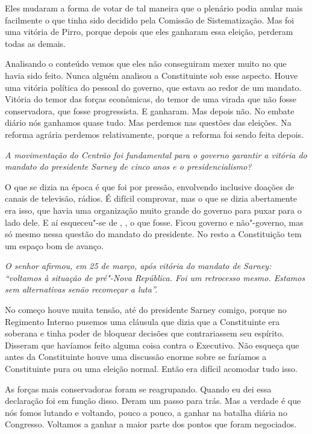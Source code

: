 Eles mudaram a forma de votar de tal maneira que o plenário podia anular
mais facilmente o que tinha sido decidido pela Comissão de
Sistematização. Mas foi uma vitória de Pirro, porque depois que eles
ganharam essa eleição, perderam todas as demais.

Analisando o conteúdo vemos que eles não conseguiram mexer muito no que
havia sido feito. Nunca alguém analisou a Constituinte sob esse aspecto.
Houve uma vitória política do pessoal do governo, que estava ao redor de
um mandato. Vitória do temor das forças econômicas, do temor de uma
virada que não fosse conservadora, que fosse progressista. E ganharam.
Mas depois não. No embate diário nós ganhamos quase tudo. Mas perdemos
nas questões das eleições. Na reforma agrária perdemos relativamente,
porque a reforma foi sendo feita depois.

\medskip

\noindent\emph{A movimentação do Centrão foi fundamental para o governo
garantir a vitória do mandato do presidente Sarney de cinco anos e o
presidencialismo?}

O que se dizia na época é que foi por pressão, envolvendo
inclusive doações de canais de televisão, rádios. É difícil comprovar,
mas o que se dizia abertamente era isso, que havia uma organização muito
grande do governo para puxar para o lado dele. E aí esqueceu"-se de ,
, o que fosse. Ficou governo e não"-governo, mas só mesmo nessa
questão do mandato do presidente. No resto a Constituição tem um espaço
bom de avanço.

\medskip

\noindent\emph{O senhor afirmou, em 25 de março, após vitória do mandato de
Sarney: ``voltamos à situação de pré"-Nova República. Foi um retrocesso
mesmo. Estamos sem alternativas senão recomeçar a luta''.}

No começo houve muita tensão, até do presidente Sarney
comigo, porque no Regimento Interno pusemos uma cláusula que dizia que a
Constituinte era soberana e tinha poder de bloquear decisões que
contrariassem seu espírito. Disseram que havíamos feito alguma coisa
contra o Executivo. Não esqueça que antes da Constituinte houve uma
discussão enorme sobre se faríamos a Constituinte pura ou uma eleição
normal. Então era difícil acomodar tudo isso.

As forças mais conservadoras foram se reagrupando. Quando eu dei essa
declaração foi em função disso. Deram um passo para trás. Mas a verdade
é que nós fomos lutando e voltando, pouco a pouco, a ganhar na batalha
diária no Congresso. Voltamos a ganhar a maior parte dos pontos que
foram negociados.

